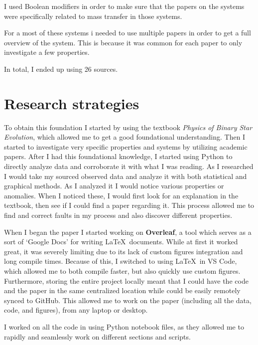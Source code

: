 \documentclass[12pt, a4paper]{article}
\begin{document}
    I used Boolean modifiers in order to make sure that the papers on the systems were specifically related to mass transfer in those systems.

    For a most of these systems i needed to use multiple papers in order to get a full overview of the system. This is because it was common for each paper to only investigate a few properties.

    In total, I ended up using 26 sources.
\section{Research strategies}
    To obtain this foundation I started by using the textbook \textit{Physics of Binary Star Evolution}, which allowed me to get a good foundational understanding. Then I started to investigate very specific properties and systems by utilizing academic papers. After I had this foundational knowledge, I started using Python to directly analyze data and corroborate it with what I was reading. As I researched I would take my sourced observed data and analyze it with both statistical and graphical methods. As I analyzed it I would notice various properties or anomalies. When I noticed these, I would first look for an explanation in the textbook, then see if I could find a paper regarding it. This process allowed me to find and correct faults in my process and also discover different properties. 

   When I began the paper I started working on \textbf{Overleaf}, a tool which serves as a sort of `Google Docs' for writing \LaTeX~documents. While at first it worked great, it was severely limiting due to its lack of custom figures integration and long compile times. Because of this, I switched to using \LaTeX~in VS Code, which allowed me to both compile faster, but also quickly use custom figures. Furthermore, storing the entire project locally meant that I could have the code and the paper in the same centralized location while could be easily remotely synced to GitHub. This allowed me to work on the paper (including all the data, code, and figures), from any laptop or desktop.

   I worked on all the code in using Python notebook files, as they allowed me to rapidly and seamlessly work on different sections and scripts.
\end{document}
